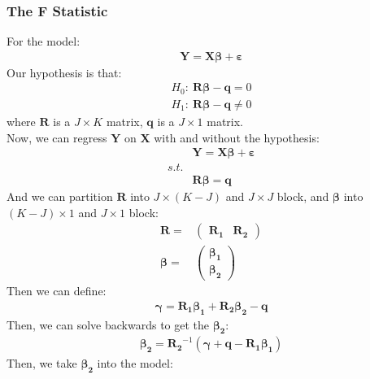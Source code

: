 \documentclass{article}
\begin{document}
\subsubsection{The F Statistic}
For the model:
	\begin{align*}
		\boldsymbol{Y} = \boldsymbol{X} \boldsymbol{\beta} + \boldsymbol{\varepsilon}
	\end{align*}
Our hypothesis is that:
	\begin{align*}
		H_0:\ \boldsymbol{R} \boldsymbol{\beta} - \boldsymbol{q} = 0\\
		H_1:\ \boldsymbol{R} \boldsymbol{\beta} - \boldsymbol{q} \neq 0
	\end{align*}
where $\boldsymbol{R}$ is a $J \times K$ matrix, $\boldsymbol{q}$ is a $J \times 1$ matrix.\\
Now, we can regress $\boldsymbol{Y}$ on $\boldsymbol{X}$ with and without the hypothesis:\\
	\begin{align*}
		&\boldsymbol{Y} = \boldsymbol{X} \boldsymbol{\beta} + \boldsymbol{\varepsilon}\\
		s.t.&\\
		& \boldsymbol{R} \boldsymbol{\beta} = \boldsymbol{q}
	\end{align*}
And we can partition $\boldsymbol{R}$ into $J \times (K - J)$ and $J \times J$ block, and $\boldsymbol{\beta}$ into $(K - J) \times 1$ and $J \times 1$ block:
	\begin{align*}
		\boldsymbol{R} = &
		\begin{pmatrix}
			\boldsymbol{R_1} & \boldsymbol{R_2}
		\end{pmatrix}\\
		\boldsymbol{\beta} = &
		\begin{pmatrix}
			\boldsymbol{\beta_1}\\
			\boldsymbol{\beta_2}
		\end{pmatrix}
	\end{align*}
Then we can define:
	\begin{align*}
		\boldsymbol{\gamma} = \boldsymbol{R_1} \boldsymbol{\beta_1} + \boldsymbol{R_2} \boldsymbol{\beta_2} - \boldsymbol{q}
	\end{align*}
Then, we can solve backwards to get the $\boldsymbol{\beta_2}$:
	\begin{align*}
		\boldsymbol{\beta_2} = \boldsymbol{R_2}^{-1}(\boldsymbol{\gamma} + \boldsymbol{q} - \boldsymbol{R_1}\boldsymbol{\beta_1})
	\end{align*}
Then, we take $\boldsymbol{\beta_2}$ into the model:
\end{document}
